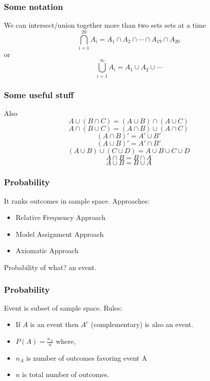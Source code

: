 
\begin{frame}
\frametitle{Some notation}

We can intersect/union together more than two sets sets at a time
\[
\bigcap_{i=1}^{20} A_i = A_1 \cap A_2 \cap \cdots \cap A_{19} \cap A_{20}
\]
or
\[
\bigcup_{i=1}^{\infty} A_i = A_1 \cup A_2 \cup \cdots 
\]



\end{frame}

\begin{frame}
\frametitle{Some useful stuff}

Also
\[
A \cup (B \cap C) = (A \cup B) \cap (A \cup C)
\]
\[
A \cap (B \cup C) = (A \cap B) \cup (A \cap C)
\]
\[
(A \cap B)' = A' \cup B'
\]
\[
(A \cup B)' = A' \cap B'
\]
\[
(A \cup B) \cup (C \cup D) = A \cup B \cup C \cup D
\]
\[
A \cap B = B \cap A
\]
\[
A \cup B = B \cup A
\]

\end{frame}


\begin{frame}[fragile]\frametitle{Probability}
It ranks outcomes in sample space. Approaches:
\begin{itemize}
\item Relative Frequency Approach
\item Model Assignment Approach
\item Axiomatic Approach
\end{itemize}
Probability of what? an event.
\end{frame}

\begin{frame}[fragile]\frametitle{Probability}
Event is subset of sample space. Rules:
\begin{itemize}
\item If $A$ is an event then $A^c$ (complementary) is also an event.
\item $P(A) = \frac{n_A}{n}$ where,
\item $n_A$ is number of outcomes favoring event A
\item $n$ is total number of outcomes.
\end{itemize}

\end{frame}


